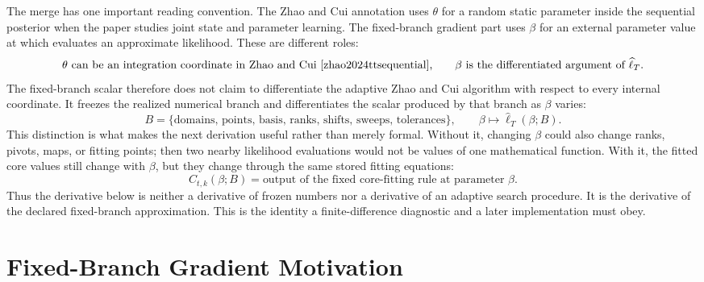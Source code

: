 \documentclass[11pt]{article}
\numberwithin{equation}{section}
\begin{document}
The merge has one important reading convention.  The Zhao and Cui \cite{zhao2024ttsequential} annotation uses
\(\theta\) for a random static parameter inside the sequential posterior when
the paper studies joint state and parameter learning.  The fixed-branch
gradient part uses \(\beta\) for an external parameter value at which
evaluates an approximate likelihood.  These are different roles:
\begin{equation}
    \theta \text{ can be an integration coordinate in Zhao and Cui \cite{zhao2024ttsequential},}
    \qquad
    \beta \text{ is the differentiated argument of } \widehat\ell_T .
    \label{eq:p24-p20-b1}
\end{equation}
The fixed-branch scalar therefore does not claim to differentiate the adaptive
Zhao and Cui \cite{zhao2024ttsequential} algorithm with respect to every internal coordinate.  It freezes the
realized numerical branch and differentiates the scalar produced by that
branch as \(\beta\) varies:
\begin{equation}
    B=\{\text{domains, points, basis, ranks, shifts, sweeps, tolerances}\},
    \qquad
    \beta\mapsto \widehat\ell_T(\beta;B).
    \label{eq:p24-p20-b2}
\end{equation}
This distinction is what makes the next derivation useful rather than merely
formal.  Without it, changing \(\beta\) could also change ranks, pivots, maps,
or fitting points; then two nearby likelihood evaluations would not be values
of one mathematical function.  With it, the fitted core values still change
with \(\beta\), but they change through the same stored fitting equations:
\begin{equation}
    C_{t,k}(\beta;B)
    =
    \text{output of the fixed core-fitting rule at parameter }\beta.
    \label{eq:p24-p20-b3}
\end{equation}
Thus the derivative below is neither a derivative of frozen numbers nor a
derivative of an adaptive search procedure.  It is the derivative of the
declared fixed-branch approximation.  This is the identity a finite-difference
diagnostic and a later implementation must obey.

\section{Fixed-Branch Gradient Motivation}
\end{document}

